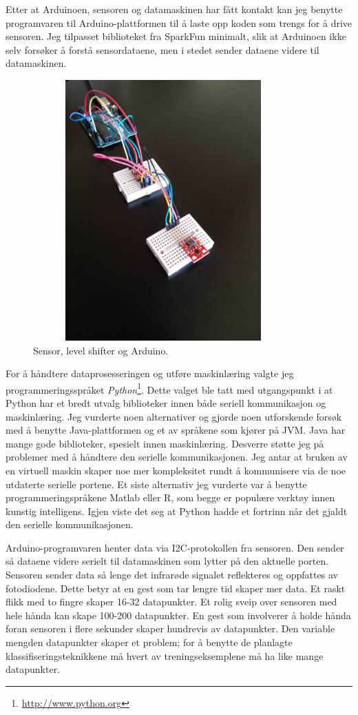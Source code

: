 Etter at Arduinoen, sensoren og datamaskinen har fått kontakt kan jeg benytte programvaren til Arduino-plattformen til å laste opp koden som trengs for å drive sensoren. Jeg tilpasset biblioteket fra SparkFun minimalt, slik at Arduinoen ikke selv forsøker å forstå sensordataene, men i stedet sender dataene videre til datamaskinen.
\begin{figure}[h]
\centering
\includegraphics[width=10cm, height=10cm]{fig/singlesensor}
\caption{Sensor, level shifter og Arduino.}
\label{fig:single-sensor}
\end{figure}
For å håndtere dataprosesseringen og utføre maskinlæring valgte jeg programmeringsspråket \emph{Python}\footnote{\url{http://www.python.org}}. Dette valget ble tatt med utgangspunkt i at Python har et bredt utvalg biblioteker innen både seriell kommunikasjon og maskinlæring. Jeg vurderte noen alternativer og gjorde noen utforskende forsøk med å benytte Java-plattformen og et av språkene som kjører på JVM. Java har mange gode biblioteker, spesielt innen maskinlæring. Desverre støtte jeg på problemer med å håndtere den serielle kommunikasjonen. Jeg antar at bruken av en virtuell maskin skaper noe mer kompleksitet rundt å kommunisere via de noe utdaterte serielle portene. Et siste alternativ jeg vurderte var å benytte programmeringspråkene Matlab eller R, som begge er populære verktøy innen kunstig intelligens. Igjen viste det seg at Python hadde et fortrinn når det gjaldt den serielle kommunikasjonen.

Arduino-programvaren henter data via I2C-protokollen fra sensoren. Den sender så dataene videre serielt til datamaskinen som lytter på den aktuelle porten. Sensoren sender data så lenge det infrarøde signalet reflekteres og oppfattes av fotodiodene. Dette betyr at en gest som tar lengre tid skaper mer data. Et raskt flikk med to fingre skaper 16-32 datapunkter. Et rolig sveip over sensoren med hele hånda kan skape 100-200 datapunkter. En gest som involverer å holde hånda foran sensoren i flere sekunder skaper hundrevis av datapunkter. Den variable mengden datapunkter skaper et problem; for å benytte de planlagte klassifiseringsteknikkene må hvert av treningseksemplene må ha like mange datapunkter.


